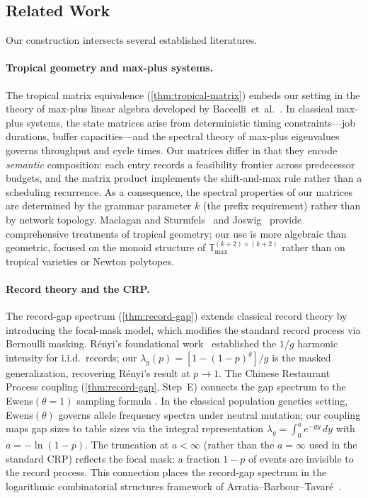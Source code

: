 \documentclass[11pt]{article}
\theoremstyle{plain}
\theoremstyle{definition}
\theoremstyle{remark}
\newcommand{\Tmax}{\mathbb{T}_{\max}}
\begin{document}
\subsection{Related Work}

Our construction intersects several established literatures.

\paragraph{Tropical geometry and max-plus systems.}
The tropical matrix equivalence (\cref{thm:tropical-matrix}) embeds
our setting in the theory of max-plus linear algebra developed by
Baccelli~et~al.~\cite{baccelli1992synchronization}.  In classical
max-plus systems, the state matrices arise from deterministic timing
constraints---job durations, buffer capacities---and the spectral
theory of max-plus eigenvalues governs throughput and cycle times.  Our
matrices differ in that they encode \emph{semantic} composition: each
entry records a feasibility frontier across predecessor budgets, and the
matrix product implements the shift-and-max rule rather than a
scheduling recurrence.  As a consequence, the spectral properties of
our matrices are determined by the grammar parameter $k$ (the prefix
requirement) rather than by network topology.
Maclagan and Sturmfels~\cite{maclagan2015introduction} and
Joswig~\cite{joswig2021essentials} provide comprehensive treatments
of tropical geometry; our use is more algebraic than geometric, focused
on the monoid structure of $\Tmax^{(k+2)\times(k+2)}$ rather than on
tropical varieties or Newton polytopes.

\paragraph{Record theory and the CRP.}
The record-gap spectrum (\cref{thm:record-gap}) extends classical
record theory \cite{nevzorov2001records,arnold1998records} by
introducing the focal-mask model, which modifies the standard record
process via Bernoulli masking.  R\'enyi's foundational
work~\cite{renyi1962theorie} established the $1/g$ harmonic intensity
for i.i.d.\ records; our $\lambda_g(p) = [1-(1-p)^g]/g$ is the masked
generalization, recovering R\'enyi's result at $p \to 1$.  The Chinese
Restaurant Process coupling (\cref{thm:record-gap}, Step~E) connects
the gap spectrum to the Ewens$(\theta{=}1)$ sampling formula
\cite{ewens1972sampling}.  In the classical population genetics setting,
Ewens$(\theta)$ governs allele frequency spectra under neutral mutation;
our coupling maps gap sizes to table sizes via the integral
representation $\lambda_g = \int_0^a e^{-gy}\, dy$ with
$a = -\ln(1-p)$.  The truncation at $a < \infty$ (rather than the
$a = \infty$ used in the standard CRP) reflects the focal mask: a
fraction $1-p$ of events are invisible to the record process.  This
connection places the record-gap spectrum in the logarithmic
combinatorial structures framework of
Arratia--Barbour--Tavar\'e~\cite{arratia2003logarithmic}.
\end{document}
